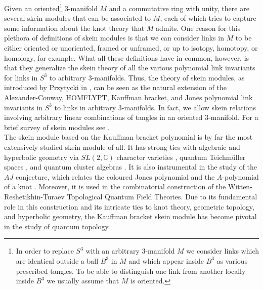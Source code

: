 \documentclass[12pt]{amsproc}
\begin{document}
Given an oriented\footnote{In order to replace $S^3$ with an arbitrary $3$-manifold $M$ we consider links which are identical outside a ball $B^3$ in $M$ and which appear inside $B^3$ as various prescribed tangles. To be able to distinguish one link from another locally inside $B^3$ we usually assume that $M$ is oriented.} $3$-manifold $M$ and a commutative ring with unity, there are several skein modules that can be associated to $M$, each of which tries to capture some information about the knot theory that $M$ admits. One reason for this plethora of definitions of skein modules is that we can consider links in $M$ to be either oriented or unoriented, framed or unframed, or up to isotopy, homotopy, or homology, for example. What all these definitions have in common, however, is that they generalize the skein theory of all the various polynomial link invariants for links in $S^3$ to arbitrary $3$-manifolds. Thus, the theory of skein modules, as introduced by Przytycki in \cite{smof3}, can be seen as the natural extension of the Alexander-Conway, HOMFLYPT, Kauffman bracket, and Jones polynomial link invariants in $S^3$ to links in arbitrary $3$-manifolds. In fact, we allow skein relations involving arbitrary linear combinations of tangles in an oriented $3$-manifold. For a brief survey of skein modules see \cite{ch63ency}. \\ 

The skein module based on the Kauffman bracket polynomial is by far the most extensively studied skein module of all. It has strong ties with algebraic and hyperbolic geometry via $SL(2, \mathbb{C})$ character varieties \cite{sl2cbullock}, quantum Teichmüller spaces \cite{bw1,fokchekhov,lequantum,kashaev}, and quantum cluster algebras \cite{mullerskein}. It is also instrumental in the study of the $AJ$ conjecture, which relates the coloured Jones polynomial and the $A$-polynomial of a knot \cite{FGL,garou,2bk}. Moreover, it is used in the combinatorial construction \cite{Li4,BHMV1} of the Witten-Reshetikhin-Turaev Topological Quantum Field Theories. Due to its fundamental role in this construction and its intricate ties to knot theory, geometric topology, and hyperbolic geometry, the Kauffman bracket skein module has become pivotal in the study of quantum topology.\\
\end{document}
